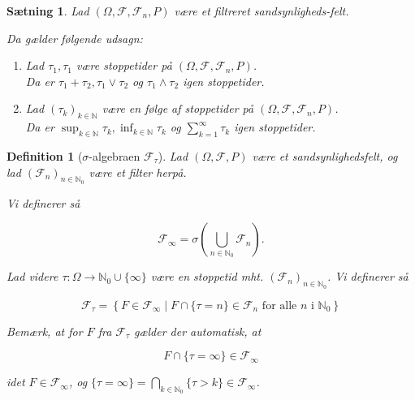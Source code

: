 \documentclass{article}
\newcommand{\N}{\mathbb{N}}
\newcommand{\1}{\mathbbm{1}}
\theoremstyle{boxed}
\newtheorem{definition}[theorem]{Definition}
\newtheorem{proposition}[theorem]{Sætning}
\begin{document}
\begin{theorem-box}
    \begin{proposition}
        Lad $(\Omega, \mathcal{F}, \mathcal{F}_n, P)$ være et filtreret sandsynligheds-felt. 

        Da gælder følgende udsagn:
        \begin{enumerate}
            \item[\textnormal{(i)}] Lad $\tau_1,\tau_1$ være stoppetider på $(\Omega, \mathcal{F}, \mathcal{F}_n, P)$.\\Da er $\tau_1+\tau_2, \tau_1\vee\tau_2$ og $\tau_1\wedge\tau_2$ igen stoppetider. 
            \item[\textnormal{(ii)}] Lad $(\tau_k)_{k\in\N}$ være en følge af stoppetider på $(\Omega, \mathcal{F}, \mathcal{F}_n, P)$.\\Da er $\sup_{k\in\N}\tau_k, \inf_{k\in\N}\tau_k$ og $\sum_{k=1}^{\infty}\tau_k$ igen stoppetider. 
        \end{enumerate}
    \end{proposition}
\end{theorem-box}
\begin{theorem-box}
    \begin{definition}[$\sigma$-algebraen $\mathcal{F}_\tau$]
        Lad $(\Omega, \mathcal{F}, P)$ være et sandsynlighedsfelt, og lad $\left(\mathcal{F}_n\right)_{n \in \mathbb{N}_0}$ være et filter herpå.

        Vi definerer så
        
        $$
        \mathcal{F}_{\infty}=\sigma\left(\bigcup_{n \in \mathbb{N}_0} \mathcal{F}_n\right) .
        $$
        
        
        Lad videre $\tau: \Omega \rightarrow \mathbb{N}_0 \cup\{\infty\}$ være en stoppetid mht. $\left(\mathcal{F}_n\right)_{n \in \mathbb{N}_0}$.
        Vi definerer så
        
        $$
        \mathcal{F}_\tau=\left\{F \in \mathcal{F}_{\infty} \mid F \cap\{\tau=n\} \in \mathcal{F}_n \text { for alle } n \text { i } \mathbb{N}_0\right\}
        $$
        
        
        Bemærk, at for $F$ fra $\mathcal{F}_\tau$ gælder der automatisk, at
        
        $$
        F \cap\{\tau=\infty\} \in \mathcal{F}_{\infty}
        $$
        
        idet $F \in \mathcal{F}_{\infty}$, og $\{\tau=\infty\}=\bigcap_{k \in \mathbb{N}_0}\{\tau>k\} \in \mathcal{F}_{\infty}$.
    \end{definition}
\end{theorem-box}
\end{document}
